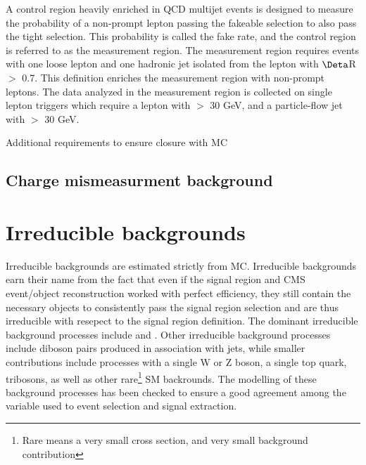 A control region heavily enriched in QCD multijet events is designed to measure the probability of a non-prompt lepton passing the fakeable selection to also pass the tight selection.
This probability is called the fake rate, and the control region is referred to as the measurement region. The measurement region requires events with one loose lepton and one
hadronic jet isolated from the lepton with $\Deta$R $\gt$ 0.7. This definition enriches the measurement region with non-prompt leptons. The data analyzed in the measurement region is collected on single lepton
triggers which require a lepton with \pt $\gt$ 30 GeV, and a particle-flow jet with \pt $\gt$ 30 GeV.

Additional requirements to ensure closure with \ttbar MC  

\subsection{Charge mismeasurment background}

\section{Irreducible backgrounds}
Irreducible backgrounds are estimated strictly from MC. Irreducible backgrounds earn their name from the fact that even if the signal region and CMS event/object reconstruction
worked with perfect efficiency, they still contain the necessary objects to consistently pass the signal region selection and are thus irreducible with resepect to the signal
region definition. The dominant irreducible background processes include \ttw and \ttz. Other irreducible background processes include diboson pairs produced in association with jets,
while smaller contributions include processes with a single W or Z boson, a single top quark, tribosons, as well as other rare\footnote{Rare means a very small cross section, and very
small background contribution} SM backrounds. The modelling of these background processes has been checked to ensure a good agreement among the variable used to event selection and
signal extraction.  


